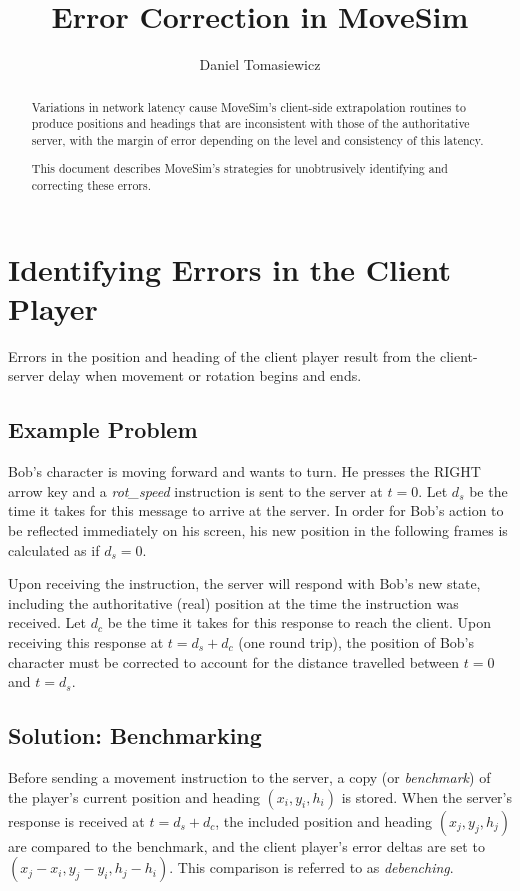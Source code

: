 \documentclass{article}
\begin{document}
\title{Error Correction in MoveSim}
\author{Daniel Tomasiewicz}
\maketitle

\begin{abstract}
Variations in network latency cause MoveSim's client-side extrapolation routines to produce positions and headings that are inconsistent with those of the authoritative server, with the margin of error depending on the level and consistency of this latency.

This document describes MoveSim's strategies for unobtrusively identifying and correcting these errors.
\end{abstract}

\section{Identifying Errors in the Client Player}

Errors in the position and heading of the client player result from the client-server delay when movement or rotation begins and ends.

\subsection*{Example Problem}

Bob's character is moving forward and wants to turn. He presses the RIGHT arrow key and a \emph{rot\_speed} instruction is sent to the server at $t=0$. Let $d_s$ be the time it takes for this message to arrive at the server. In order for Bob's action to be reflected immediately on his screen, his new position in the following frames is calculated as if $d_s=0$.

Upon receiving the instruction, the server will respond with Bob's new state, including the authoritative (real) position at the time the instruction was received. Let $d_c$ be the time it takes for this response to reach the client. Upon receiving this response at $t=d_s+d_c$ (one round trip), the position of Bob's character must be corrected to account for the distance travelled between $t=0$ and $t=d_s$.

\subsection*{Solution: Benchmarking}

Before sending a movement instruction to the server, a copy (or \emph{benchmark}) of the player's current position  and heading $(x_i, y_i, h_i)$ is stored. When the server's response is received at $t=d_s+d_c$, the included position and heading $(x_j, y_j, h_j)$ are compared to the benchmark, and the client player's error deltas are set to $(x_j-x_i, y_j-y_i, h_j-h_i)$. This comparison is referred to as \emph{debenching}.
\end{document}

